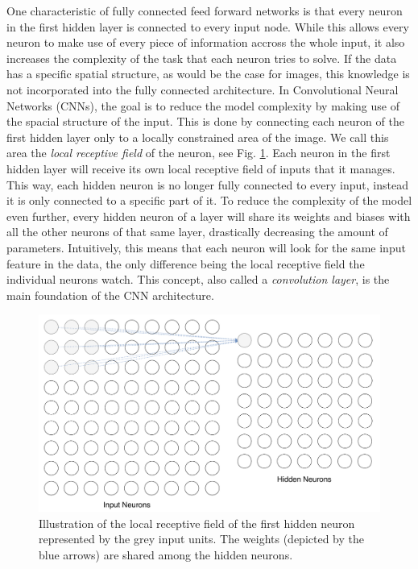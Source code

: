 One characteristic of fully connected feed forward networks is that
every neuron in the first hidden layer is connected to every input
node. While this allows every neuron to make use of every piece of
information accross the whole input, it also increases the complexity
of the task that each neuron tries to solve. If the data has a
specific spatial structure, as would be the case for images, this
knowledge is not incorporated into the fully connected
architecture. In Convolutional Neural Networks (CNNs), the goal is to
reduce the model complexity by making use of the spacial structure of
the input. This is done by connecting each neuron of the first hidden
layer only to a locally constrained area of the image. We call this
area the \textit{local receptive field} of the neuron, see
Fig. \ref{fig:receptive-field}. Each neuron in
the first hidden layer will receive its own local receptive field of
inputs that it manages. This way, each hidden neuron is no longer
fully connected to every input, instead it is only connected to a
specific part of it. To reduce the complexity of the model even
further, every hidden neuron of a layer will share its weights and
biases with all the other neurons of that same layer, drastically
decreasing the amount of parameters. Intuitively, this
means that each neuron will look for the same input feature in the
data, the only difference being the local receptive field the
individual neurons watch. This concept, also called a
\textit{convolution layer}, is the main foundation of the CNN
architecture.
\begin{figure}[h]
  \centering
  \includegraphics[width=\textwidth]{../figures/receptive_field}
  \caption{Illustration of the local receptive field of the first
    hidden neuron represented by the grey input units. The weights
    (depicted by the blue arrows) are shared among the hidden
    neurons.}
  \label{fig:receptive-field}
\end{figure}


